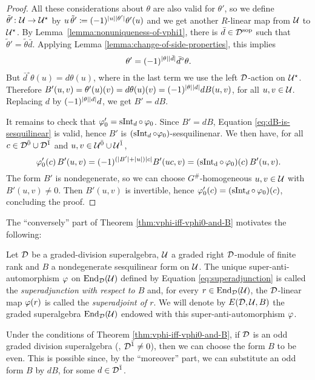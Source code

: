 \begin{proof}
	All these considerations about $\theta$ are also valid for $\theta'$, so we define $\tilde\theta'\colon \mathcal U \to \mathcal U^\star$ by $u\,\tilde\theta' \coloneqq (-1)^{|u||\theta'|} \theta'(u)$ and we get another $R$-linear map from $\mathcal U$ to $\mathcal U^\star$.
	By Lemma~\ref{lemma:nonuniqueness-of-vphi1}, there is $\bar d\in \mathcal{D}^{\mathrm{sop}}$ such that $\tilde\theta' = \tilde\theta \bar d$.
	Applying Lemma \ref{lemma:change-of-side-properties}, this implies \[\theta' = (-1)^{|\theta||\bar d|} \bar d^\circ \theta.\]
	But $\bar d^\circ \theta (u) = d\theta(u)$, where in the last term we use the left $\mathcal{D}$-action on $\mathcal U^\star$.
	Therefore $B'(u,v) = \theta'(u)(v) = d\theta(u)(v) = (-1)^{|\theta||d|} dB(u, v)$, for all $u,v \in \mathcal U$.
	Replacing $d$ by $(-1)^{|\theta||d|} d$, we get $B' = dB$.

	It remains to check that $\varphi_0' = \operatorname{sInt}_d \circ\, \varphi_0$.
	Since $B' = dB$, Equation \eqref{eq:dB-is-sesquilinear} is valid, hence $B'$ is $(\operatorname{sInt}_d \circ \varphi_0)$-sesquilinenar.
	We then have, for all $c\in \mathcal{D}^{\bar0} \cup \mathcal{D}^{\bar1}$ and $u,v \in \mathcal U^{\bar0} \cup \mathcal U^{\bar1}$,
	\[
		\varphi_0'(c)\, B'(u,v) = (-1)^{(|B'| + |u|) |c|} B'(uc,v) = (\operatorname{sInt_d} \circ\, \varphi_0) (c)\, B'(u,v).
	\]
	The form $B'$ is nondegenerate, so we can choose $G^\#$-homogeneous $u,v\in \mathcal U$ with $B'(u,v)\neq 0$. Then $B'(u,v)$ is invertible, hence $\varphi_0' (c) = (\operatorname{sInt}_d \circ\, \varphi_0) (c)$, concluding the proof.
\end{proof}

The ``conversely'' part of Theorem \ref{thm:vphi-iff-vphi0-and-B} motivates the following:

\begin{defi}\label{def:superadjunction}
	Let $\mathcal{D}$ be a graded-division superalgebra, $\mathcal U$ a graded right $\mathcal{D}$-module of finite rank and $B$ a nondegenerate sesquilinear form on $\mathcal U$.
	The unique super-anti-automorphism $\varphi$ on $\operatorname{End}_{\mathcal{D}}(\mathcal U)$ defined by Equation \eqref{eq:superadjunction} is called the \emph{superadjunction with respect to $B$} and, for every $r\in \operatorname{End}_{\mathcal{D}}(\mathcal U)$, the $\mathcal{D}$-linear map $\varphi(r)$ is called the \emph{superadjoint of $r$}. 
	We will denote by $E(\mathcal{D}, \mathcal U, B)$ the graded superalgebra $\operatorname{End}_{\mathcal{D}}(\mathcal U)$ endowed with this super-anti-automorphism $\varphi$. 
\end{defi}

\begin{remark}\label{conv:pick-even-form}
	Under the conditions of Theorem \ref{thm:vphi-iff-vphi0-and-B}, if $\mathcal{D}$ is an odd graded division superalgebra (\ie, $\mathcal{D}^{\bar1} \neq 0$), then we can choose the form $B$ to be even. 
	This is possible since, by the ``moreover'' part, we can substitute an odd form $B$ by $dB$, for some $d\in \mathcal{D}^{\bar1}$.
\end{remark}

